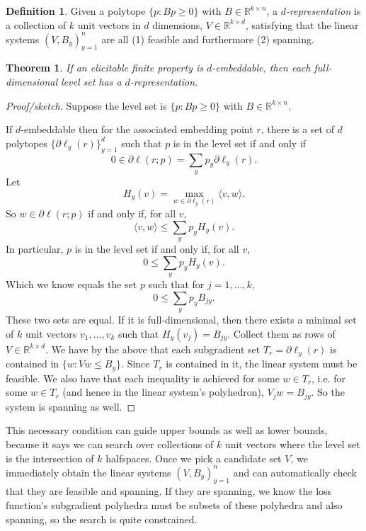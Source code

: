 \documentclass[12pt]{article}
\newtheorem{theorem}{Theorem}
\theoremstyle{definition}
\newtheorem{definition}{Definition}
\newcommand{\reals}{\mathbb{R}}
\begin{document}
\begin{definition}
  Given a polytope $\{p : Bp \geq 0\}$ with $B \in \reals^{k \times n}$, a \emph{$d$-representation} is a collection of $k$ unit vectors in $d$ dimensions, $V \in \reals^{k \times d}$, satisfying that the linear systems $(V, B_y)_{y=1}^n$ are all (1) feasible and furthermore (2) spanning.
\end{definition}

\begin{theorem}
  If an elicitable finite property is $d$-embeddable, then each full-dimensional level set has a $d$-representation.
\end{theorem}
\begin{proof}[Proof/sketch]
  Suppose the level set is $\{p : Bp \geq 0\}$ with $B \in \reals^{k \times n}$.
  
  If $d$-embeddable then for the associated embedding point $r$, there is a set of $d$ polytopes $\{\partial \ell_y(r)\}_{y=1}^d$ such that $p$ is in the level set if and only if
  \[ 0 \in \partial \ell(r;p) = \sum_y p_y \partial \ell_y(r) . \]
  Let
    \[ H_y(v) = \max_{w \in \partial \ell_y(r)} \langle v , w \rangle . \]
  So $w \in \partial \ell(r;p)$ if and only if, for all $v$,
    \[ \langle v, w\rangle \leq \sum_y p_y H_y(v) . \]
  In particular, $p$ is in the level set if and only if, for all $v$,
    \[ 0 \leq \sum_y p_y H_y(v) . \]
  Which we know equals the set $p$ such that for $j=1,\dots,k$,
    \[ 0 \leq \sum_y p_y B_{jy} . \]
  These two sets are equal.
  If it is full-dimensional, then there exists a minimal set of $k$ unit vectors $v_1,\dots,v_k$ such that $H_y(v_j) = B_{jy}$.
  Collect them as rows of $V \in \reals^{k \times d}$.
  We have by the above that each subgradient set $T_r = \partial \ell_y(r)$ is contained in $\{w: Vw \leq B_y\}$.
  Since $T_r$ is contained in it, the linear system must be feasible.
  We also have that each inequality is achieved for some $w \in T_r$, i.e. for some $w \in T_r$ (and hence in the linear system's polyhedron), $V_jw = B_{jy}$.
  So the system is spanning as well.
\end{proof}

This necessary condition can guide upper bounds as well as lower bounds, because it says we can search over collections of $k$ unit vectors where the level set is the intersection of $k$ halfspaces.
Once we pick a candidate set $V$, we immediately obtain the linear systems $(V,B_y)_{y=1}^n$ and can automatically check that they are feasible and spanning.
If they are spanning, we know the loss function's subgradient polyhedra must be subsets of these polyhedra and also spanning, so the search is quite constrained.
\end{document}
